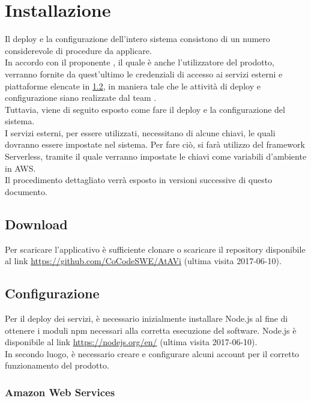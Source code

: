 \section{Installazione}
Il deploy e la configurazione dell'intero sistema consistono di un numero considerevole di procedure da applicare.\\
In accordo con il proponente \PROPONENTE, il quale è anche l'utilizzatore del prodotto, verranno fornite da quest'ultimo le credenziali di accesso ai servizi esterni e piattaforme elencate in \ref{configurazione}, in maniera tale che le attività di deploy e configurazione siano realizzate dal team \GRUPPO.\\
Tuttavia, viene di seguito esposto come fare il deploy e la configurazione del sistema.\\
I servizi esterni, per essere utilizzati, necessitano di alcune chiavi, le quali dovranno essere impostate nel sistema. Per fare ciò, si farà utilizzo del framework Serverless, tramite il quale verranno impostate le chiavi come variabili d'ambiente in AWS.\\
Il procedimento dettagliato verrà esposto in versioni successive di questo documento.
\subsection{Download}\label{download}
Per scaricare l'applicativo è sufficiente clonare o scaricare il repository disponibile al link \url{https://github.com/CoCodeSWE/AtAVi} (ultima visita 2017-06-10).

\subsection{Configurazione}\label{configurazione}
Per il deploy dei servizi, è necessario inizialmente installare Node.js al fine di  ottenere i moduli npm necessari alla corretta esecuzione del software. Node.js è disponibile al link \url{https://nodejs.org/en/} (ultima visita 2017-06-10).\\In secondo luogo, è necessario creare e configurare alcuni account per il corretto funzionamento del prodotto.

\subsubsection{Amazon Web Services}
